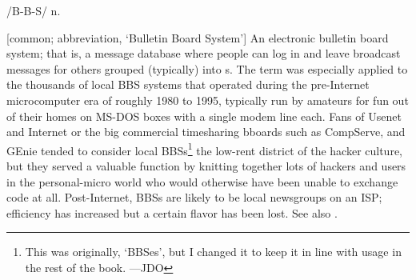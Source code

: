  /B-B-S/ n.

[common; abbreviation, `Bulletin Board System'] An electronic bulletin board
system; that is, a message database where people can log in and leave broadcast
messages for others grouped (typically) into s. The term
was especially applied to the thousands of local BBS systems that operated
during the pre-Internet microcomputer era of roughly 1980 to 1995, typically run
by amateurs for fun out of their homes on MS-DOS boxes with a single modem line
each. Fans of Usenet and Internet or the big commercial timesharing bboards such
as CompServe, and GEnie tended to consider local BBSs\footnote{This was
originally, `BBSes', but I changed it to keep it in line with usage in the rest
of the book. ---JDO} the low-rent district of the hacker culture, but they
served a valuable function by knitting together lots of hackers and users in the
personal-micro world who would otherwise have been unable to exchange code at
all. Post-Internet, BBSs are likely to be local newsgroups on an ISP; efficiency
has increased but a certain flavor has been lost. See also .

